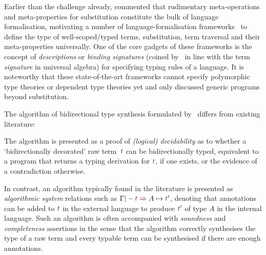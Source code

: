 Earlier than the \PoplMark challenge already, \citet{Altenkirch1993} commented that rudimentary meta-operations and meta-properties for substitution constitute the bulk of language formalisation, motivating a number of language-formalisation frameworks~\citep{Ahrens2018,Fiore2022,Gheri2020,Ahrens2022,Allais2021} to define the type of well-scoped/typed terms, substitution, term traversal and their meta-properties universally.
One of the core gadgets of these frameworks is the concept of \emph{descriptions} or \emph{binding signatures} (coined by~\citet{Aczel1978} in line with the term \emph{signature} in universal algebra) for specifying typing rules of a language.
It is noteworthy that these state-of-the-art frameworks cannot specify polymorphic type theories or dependent type theories yet and only \citeauthor{Allais2021} discussed generic programs beyond substitution.

\begin{remark}\label{re:type-synthesis-as-decidability-proof}
The algorithm of bidirectional type synthesis formulated by~\citeauthor{Wadler2022} differs from existing literature:
\begin{enumerate*}
  \item The algorithm is presented as a proof of \emph{(logical) decidability} as to whether a `bidirectionally decorated' raw term~$\isTerm{t}$ can be bidirectionally typed, equivalent to a program that returns a typing derivation for $\isTerm{t}$, if one exists, or the evidence of a contradiction otherwise.
  \item In contrast, an algorithm typically found in the literature is presented as \emph{algorithmic system} relations such as $\Gamma |- \isTerm{t} \syn A \mapsto \isTerm{t}'$, denoting that annotations can be added to $\isTerm{t}$ in the external language to produce $\isTerm{t}'$ of type $A$ in the internal language.
    Such an algorithm is often accompanied with \emph{soundness} and \emph{completeness} assertions in the sense that the algorithm correctly synthesises the type of a raw term and every typable term can be synthesised if there are enough annotations.
\end{enumerate*}
\end{remark}

